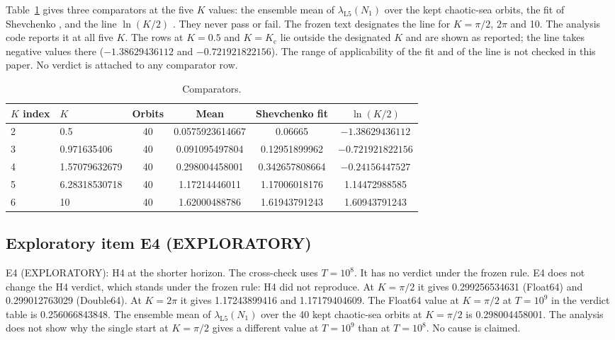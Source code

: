 \documentclass[aip,cha,reprint,amsmath,amssymb,longbibliography]{revtex4-2}
\newcommand{\tenp}[1]{\ensuremath{10^{#1}}}
\newcommand{\lam}[1]{\ensuremath{\lambda_{\mathrm{#1}}}}
\newcommand{\Kc}{\ensuremath{K_{\mathrm{c}}}}
\begin{document}
Table~\ref{tab:comp} gives three comparators at the five $K$ values: the ensemble mean of $\lam{L5}(N_1)$ over the kept chaotic-sea orbits, the fit of Shevchenko \cite{Shevchenko2014}, and the line $\ln(K/2)$ \cite{Chirikov1979}.
They never pass or fail.
The frozen text designates the line for $K=\pi/2$, $2\pi$ and 10.
The analysis code reports it at all five $K$.
The rows at $K=0.5$ and $K=\Kc$ lie outside the designated $K$ and are shown as reported; the line takes negative values there ($-1.38629436112$ and $-0.721921822156$).
The range of applicability of the fit and of the line is not checked in this paper.
No verdict is attached to any comparator row.

\begin{table}
\caption{Comparators.}
\label{tab:comp}
\begin{ruledtabular}
\begin{tabular}{llcccc}
$K$ index & $K$ & Orbits & Mean & Shevchenko fit & $\ln(K/2)$ \\
\hline
2 & 0.5 & 40 & 0.0575923614667 & 0.06665 & $-1.38629436112$ \\
3 & 0.971635406 & 40 & 0.091095497804 & 0.12951899962 & $-0.721921822156$ \\
4 & 1.57079632679 & 40 & 0.298004458001 & 0.342657808664 & $-0.24156447527$ \\
5 & 6.28318530718 & 40 & 1.17214446011 & 1.17006018176 & 1.14472988585 \\
6 & 10 & 40 & 1.62000488786 & 1.61943791243 & 1.60943791243 \\
\end{tabular}
\end{ruledtabular}
\end{table}

\subsection{Exploratory item E4 (EXPLORATORY)}
\label{sub:h4exp}

E4 (EXPLORATORY): H4 at the shorter horizon.
The cross-check uses $T=$\tenp{8}.
It has no verdict under the frozen rule.
E4 does not change the H4 verdict, which stands under the frozen rule: H4 did not reproduce.
At $K=\pi/2$ it gives 0.299256534631 (Float64) and 0.299012763029 (Double64).
At $K=2\pi$ it gives 1.17243899416 and 1.17179404609.
The Float64 value at $K=\pi/2$ at $T=$\tenp{9} in the verdict table is 0.256066843848.
The ensemble mean of $\lam{L5}(N_1)$ over the 40 kept chaotic-sea orbits at $K=\pi/2$ is 0.298004458001.
The analysis does not show why the single start at $K=\pi/2$ gives a different value at $T=$\tenp{9} than at $T=$\tenp{8}.
No cause is claimed.
\end{document}
